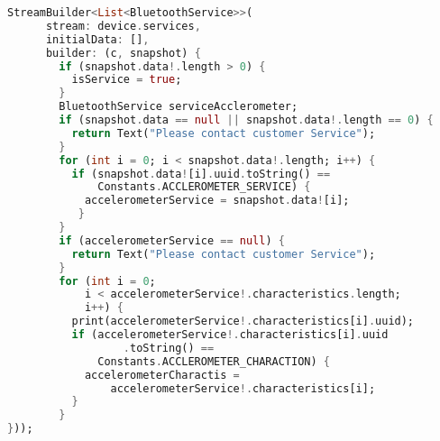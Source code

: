 \begin{lstlisting}[float,language=dart,caption=Tập lệnh để tìm kiểm dịch vụ cảm biến ,label=flutterBle,captionpos=b]
StreamBuilder<List<BluetoothService>>(
      stream: device.services,
      initialData: [],
      builder: (c, snapshot) {
        if (snapshot.data!.length > 0) {
          isService = true;
        }
        BluetoothService serviceAcclerometer;
        if (snapshot.data == null || snapshot.data!.length == 0) {
          return Text("Please contact customer Service");
        }
        for (int i = 0; i < snapshot.data!.length; i++) {
          if (snapshot.data![i].uuid.toString() ==
              Constants.ACCLEROMETER_SERVICE) {
            accelerometerService = snapshot.data![i];
           }
        }
        if (accelerometerService == null) {
          return Text("Please contact customer Service");
        }
        for (int i = 0;
            i < accelerometerService!.characteristics.length;
            i++) {
          print(accelerometerService!.characteristics[i].uuid);
          if (accelerometerService!.characteristics[i].uuid
                  .toString() ==
              Constants.ACCLEROMETER_CHARACTION) {
            accelerometerCharactis =
                accelerometerService!.characteristics[i];
          }
        }
}));

\end{lstlisting}
